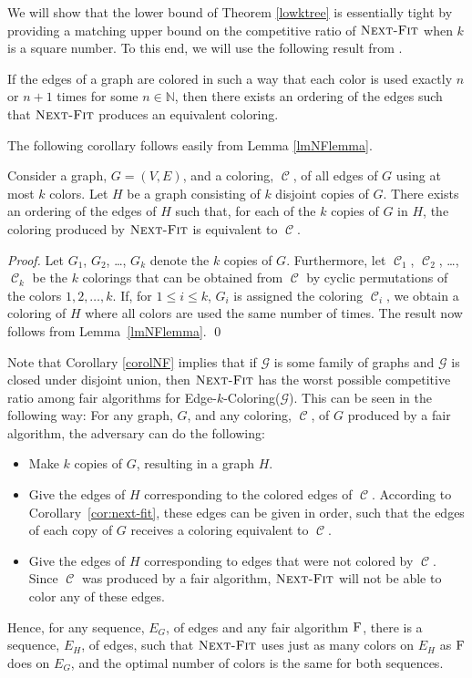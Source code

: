 \documentclass[smallextended]{svjour3}
\newcommand{\mcarg}[1]{{\sc Edge-$k$-Coloring(#1)}\xspace}
\newcommand{\coloring}{\ensuremath{\operatorname{\mathscr{C}}}\xspace}
\newcommand{\NF}{\ensuremath{\operatorname{\textsc{Next-Fit}}}\xspace}
\newcommand{\FAIR}{\ensuremath{\operatorname{\textsc{F}}}\xspace}
\begin{document}
We will show that the lower bound of Theorem \ref{lowktree} is essentially tight by providing a matching upper bound on the competitive ratio of \NF when $k$ is a square number. To this end, we will use the following result
 from \cite{kedge}.  
\begin{lemma}
If the edges of a graph are colored in such a way that each color is used exactly $n$ or $n+1$ times for some $n\in\mathbb{N}$, then there exists an ordering of the edges such that \NF produces an equivalent coloring.
\label{lmNFlemma}
\end{lemma}

The following corollary follows easily from Lemma \ref{lmNFlemma}.

\begin{corollary}
\label{cor:next-fit}
Consider a graph, $G=(V,E)$, and a coloring, \coloring, of all edges of $G$ using
 at most $k$ colors.
Let $H$ be a graph consisting of $k$ disjoint copies of $G$. 
There exists an ordering of the edges of $H$ such that, for each of
 the $k$ copies of $G$ in $H$, the coloring produced by \NF is
 equivalent to \coloring.
\label{corolNF}
\end{corollary}

\begin{proof}
Let $G_1$, $G_2$, \ldots, $G_k$ denote the $k$ copies of $G$.
Furthermore, let $\coloring_1$, $\coloring_2$, \ldots, $\coloring_k$
 be the $k$ colorings that can be obtained from \coloring by cyclic
 permutations of the colors $1,2,\ldots,k$.
If, for $1 \leq i \leq k$, $G_i$ is assigned the coloring
 $\coloring_i$, we obtain a coloring of $H$ where all colors are used
 the same number of times.
The result now follows from Lemma~\ref{lmNFlemma}.
\qed\end{proof}

Note that Corollary \ref{corolNF} implies that if $\mathcal{G}$ is
some family of graphs and $\mathcal{G}$ is closed under disjoint
union, then \NF has the worst possible competitive ratio among fair
algorithms for \mcarg{$\mathcal{G}$}. 
This can be seen in the following way:
For any graph, $G$, and any coloring, \coloring, of $G$ produced by a
 fair algorithm, the adversary can do the following:
\begin{itemize}
\item Make $k$ copies of $G$, resulting in a graph $H$.
\item Give the edges of $H$ corresponding to the colored edges of \coloring.
 According to Corollary~\ref{cor:next-fit}, these edges can be given in order, such that the edges of each copy of $G$ receives a coloring equivalent to \coloring.
\item Give the edges of $H$ corresponding to edges that were not colored by \coloring.
 Since \coloring was produced by a fair algorithm, \NF will not be able to color any of these edges.
\end{itemize}
Hence, for any sequence, $E_G$, of edges and any fair algorithm \FAIR, there is a sequence, $E_H$, of edges, such that \NF uses just as many colors on $E_H$ as \FAIR does on $E_G$, and the optimal number of colors is the same for both sequences.
\end{document}
